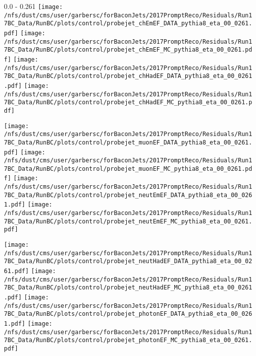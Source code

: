 \documentclass[t,compress]{beamer}
\begin{document}
\begin{frame}{0.0 - 0.261}
	\texttt{[image: /nfs/dust/cms/user/garbersc/forBaconJets/2017PromptReco/Residuals/Run17BC\_Data/RunBC/plots/control/probejet\_chEmEF\_DATA\_pythia8\_eta\_00\_0261.pdf]}
	\texttt{[image: /nfs/dust/cms/user/garbersc/forBaconJets/2017PromptReco/Residuals/Run17BC\_Data/RunBC/plots/control/probejet\_chEmEF\_MC\_pythia8\_eta\_00\_0261.pdf]}
	\texttt{[image: /nfs/dust/cms/user/garbersc/forBaconJets/2017PromptReco/Residuals/Run17BC\_Data/RunBC/plots/control/probejet\_chHadEF\_DATA\_pythia8\_eta\_00\_0261.pdf]}
	\texttt{[image: /nfs/dust/cms/user/garbersc/forBaconJets/2017PromptReco/Residuals/Run17BC\_Data/RunBC/plots/control/probejet\_chHadEF\_MC\_pythia8\_eta\_00\_0261.pdf]}
\newline

\vspace{-0.65cm}
	\texttt{[image: /nfs/dust/cms/user/garbersc/forBaconJets/2017PromptReco/Residuals/Run17BC\_Data/RunBC/plots/control/probejet\_muonEF\_DATA\_pythia8\_eta\_00\_0261.pdf]}
	\texttt{[image: /nfs/dust/cms/user/garbersc/forBaconJets/2017PromptReco/Residuals/Run17BC\_Data/RunBC/plots/control/probejet\_muonEF\_MC\_pythia8\_eta\_00\_0261.pdf]}
	\texttt{[image: /nfs/dust/cms/user/garbersc/forBaconJets/2017PromptReco/Residuals/Run17BC\_Data/RunBC/plots/control/probejet\_neutEmEF\_DATA\_pythia8\_eta\_00\_0261.pdf]}
	\texttt{[image: /nfs/dust/cms/user/garbersc/forBaconJets/2017PromptReco/Residuals/Run17BC\_Data/RunBC/plots/control/probejet\_neutEmEF\_MC\_pythia8\_eta\_00\_0261.pdf]}
\newline

\vspace{-0.65cm}
	\texttt{[image: /nfs/dust/cms/user/garbersc/forBaconJets/2017PromptReco/Residuals/Run17BC\_Data/RunBC/plots/control/probejet\_neutHadEF\_DATA\_pythia8\_eta\_00\_0261.pdf]}
	\texttt{[image: /nfs/dust/cms/user/garbersc/forBaconJets/2017PromptReco/Residuals/Run17BC\_Data/RunBC/plots/control/probejet\_neutHadEF\_MC\_pythia8\_eta\_00\_0261.pdf]}
	\texttt{[image: /nfs/dust/cms/user/garbersc/forBaconJets/2017PromptReco/Residuals/Run17BC\_Data/RunBC/plots/control/probejet\_photonEF\_DATA\_pythia8\_eta\_00\_0261.pdf]}
	\texttt{[image: /nfs/dust/cms/user/garbersc/forBaconJets/2017PromptReco/Residuals/Run17BC\_Data/RunBC/plots/control/probejet\_photonEF\_MC\_pythia8\_eta\_00\_0261.pdf]}
\end{frame}
\end{document}

